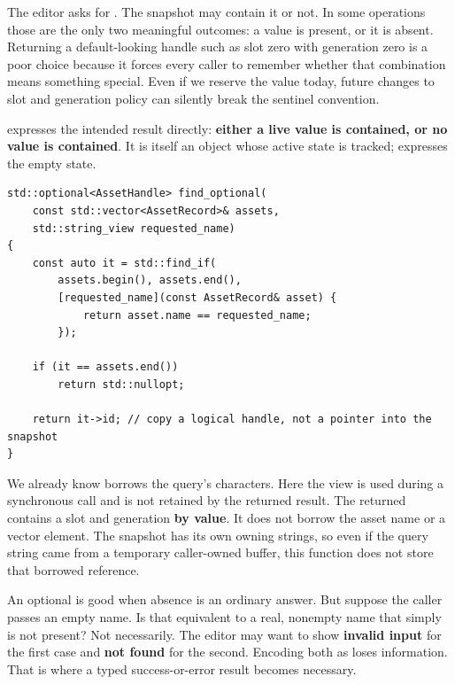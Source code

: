 \hypertarget{05-engine-i-ch006-a-missing-asset-is-different-from-an-invalid-request}{}

The editor asks for . The snapshot may contain it or not. In some operations those are the only two meaningful outcomes: a value is present, or it is absent. Returning a default-looking handle such as slot zero with generation zero is a poor choice because it forces every caller to remember whether that combination means something special. Even if we reserve the value today, future changes to slot and generation policy can silently break the sentinel convention.

 expresses the intended result directly: \textbf{either a live  value is contained, or no  value is contained}. It is itself an object whose active state is tracked;  expresses the empty state.

\begin{verbatim}
std::optional<AssetHandle> find_optional(
    const std::vector<AssetRecord>& assets,
    std::string_view requested_name)
{
    const auto it = std::find_if(
        assets.begin(), assets.end(),
        [requested_name](const AssetRecord& asset) {
            return asset.name == requested_name;
        });

    if (it == assets.end())
        return std::nullopt;

    return it->id; // copy a logical handle, not a pointer into the snapshot
}
\end{verbatim}

We already know  borrows the query's characters. Here the view is used during a synchronous call and is not retained by the returned result. The returned  contains a slot and generation \textbf{by value}. It does not borrow the asset name or a vector element. The snapshot has its own owning strings, so even if the query string came from a temporary caller-owned buffer, this function does not store that borrowed reference.

An optional is good when absence is an ordinary answer. But suppose the caller passes an empty name. Is that equivalent to a real, nonempty name that simply is not present? Not necessarily. The editor may want to show \textbf{invalid input} for the first case and \textbf{not found} for the second. Encoding both as  loses information. That is where a typed success-or-error result becomes necessary.

